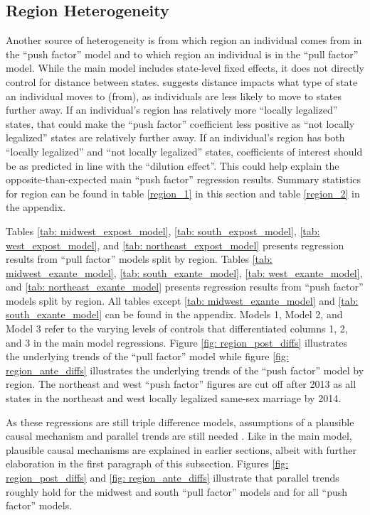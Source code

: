 \documentclass[12pt,letterpaper]{article}
\begin{document}
\clearpage
\subsection{Region Heterogeneity}

Another source of heterogeneity is from which region an individual comes from in the “push factor” model and to which region an individual is in the “pull factor” model. While the main model includes state-level fixed effects, it does not directly control for distance between states. \citep{1} suggests distance impacts what type of state an individual moves to (from), as individuals are less likely to move to states further away. If an individual’s region has relatively more “locally legalized” states, that could make the  “push factor” coefficient less positive as “not locally legalized” states are relatively further away. If an individual’s region has both “locally legalized” and “not locally legalized” states, coefficients of interest should be as predicted in line with the “dilution effect”. This could help explain the opposite-than-expected main “push factor” regression results. Summary statistics for region can be found in table \ref{region_1} in this section and table \ref{region_2} in the appendix.



Tables \ref{tab: midwest_expost_model}, \ref{tab: south_expost_model}, \ref{tab: west_expost_model}, and \ref{tab: northeast_expost_model} presents regression results from “pull factor” models split by region. Tables \ref{tab: midwest_exante_model}, \ref{tab: south_exante_model}, \ref{tab: west_exante_model}, and \ref{tab: northeast_exante_model}  presents regression results from “push factor” models split by region. All tables except \ref{tab: midwest_exante_model} and \ref{tab: south_exante_model} can be found in the appendix. Models 1, Model 2, and Model 3 refer to the varying levels of controls that differentiated columns 1, 2, and 3 in the main model regressions.  Figure \ref{fig: region_post_diffs} illustrates the underlying trends of the “pull factor” model while figure \ref{fig: region_ante_diffs} illustrates the underlying trends of the “push factor” model by region. The northeast and west “push factor” figures are cut off after 2013 as all states in the northeast and west locally legalized same-sex marriage by 2014.

As these regressions are still triple difference models, assumptions of a plausible causal mechanism and parallel trends are still needed \citep{24, 25}. Like in the main model, plausible causal mechanisms are explained in earlier sections, albeit with further elaboration in the first paragraph of this subsection. Figures \ref{fig: region_post_diffs} and \ref{fig: region_ante_diffs} illustrate that parallel trends roughly hold for the midwest and south “pull factor” models and for all “push factor” models. 
\end{document}
